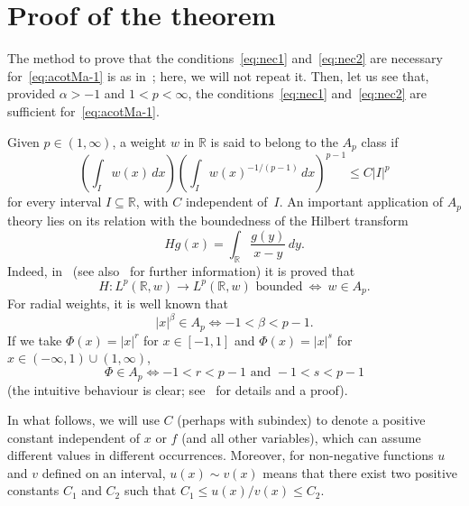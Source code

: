 \documentclass[a4paper]{amsart}
\numberwithin{equation}{section}
\theoremstyle{plain}
\theoremstyle{remark}
\newcommand{\R}{\mathbb{R}}
\begin{document}
\section{Proof of the theorem}

The method to prove that the conditions~\eqref{eq:nec1} and~\eqref{eq:nec2}
are necessary for~\eqref{eq:acotMa-1} is as in~\cite{BCV}; here, we will not repeat it. 
Then, let us see that, provided $\alpha>-1$ and $1<p<\infty$, 
the conditions~\eqref{eq:nec1} and~\eqref{eq:nec2} are sufficient for~\eqref{eq:acotMa-1}.

Given $p \in (1,\infty)$, a weight $w$ in $\R$ is said to belong to the $A_p$ class if
$$
   \left(\int_I w(x)\,dx \right) \left(\int_I w(x)^{-1/(p-1)}\,dx \right)^{p-1}
   \le C|I|^p
$$
for every interval $I \subseteq \R$, with $C$ independent of~$I$. An
important application of $A_p$ theory lies on its relation with the boundedness
of the Hilbert transform
$$
   Hg(x) = \int_{\R} \frac{g(y)}{x-y}\,dy.
$$
Indeed, in~\cite{HMW} (see also~\cite{GcRf} for further information) it is proved that
$$
  H \colon L^p(\R,w) \to L^p(\R,w) \textrm{ bounded}
  \ \iff \ w \in A_p.
$$
For radial weights, it is well known that
$$
   |x|^\beta \in A_p \iff -1< \beta < p-1.
$$
If we take $\Phi(x) = |x|^r$ for $x \in [-1,1]$ and $\Phi(x) = |x|^s$ for $x
\in (-\infty,1) \cup (1,\infty)$,
\begin{equation}
\label{eq:PhiAp}
   \Phi \in A_p \iff -1 < r < p-1 \text{ and } -1 < s < p-1
\end{equation}
(the intuitive behaviour is clear; see~\cite{Per} for details and a proof).

In what follows, we will use $C$ (perhaps with subindex) to denote a positive constant independent of $x$ or $f$ (and all other variables), which can assume different values in different occurrences. Moreover, for non-negative functions $u$ and $v$ defined on an interval, $u(x) \sim v(x)$ means that there exist two positive constants $C_1$ and $C_2$ such that $C_1 \le u(x)/v(x) \le C_2$. 
\end{document}
